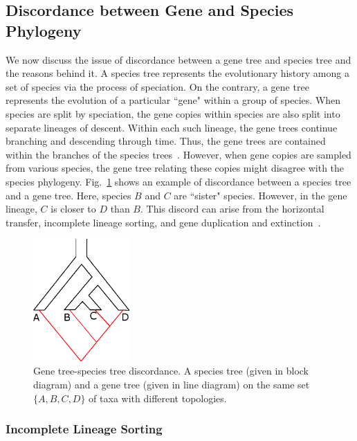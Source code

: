 \subsection{Discordance between Gene and Species Phylogeny}
We now discuss the issue of discordance between a gene tree and species tree and the reasons behind it. A species tree represents the evolutionary history among a set of species via the process of speciation. On the contrary, a gene tree represents the evolution of a particular ``gene" within a group of species. When species are split by speciation, the gene copies within species are also split into separate lineages of descent.  Within each such lineage, the gene trees continue branching and descending through time. Thus, the gene trees are contained within the branches of the species trees~\cite{maddison1997gene}.
However, when gene copies are sampled from various species, the gene tree relating these copies might disagree with the species phylogeny. Fig.~\ref{fig:discordance} shows an example of discordance between a species tree and a gene tree. Here, species $B$ and $C$ are ``sister" species. However, in the gene lineage, $C$ is closer to $D$ than $B$. This discord can arise from the horizontal transfer, incomplete lineage sorting, and gene duplication and extinction~\cite{maddison1997gene}. 

\begin{figure}[!tb]
	\centering
	\includegraphics[width=0.33\textwidth]{Figure/discordance.eps}
	\caption{Gene tree-species tree discordance. A species tree (given in block diagram) and a gene tree (given in line diagram) on the same set $\{A,B,C,D\}$ of taxa with different topologies.}
	\label{fig:discordance}
\end{figure}



\subsubsection{Incomplete Lineage Sorting}

